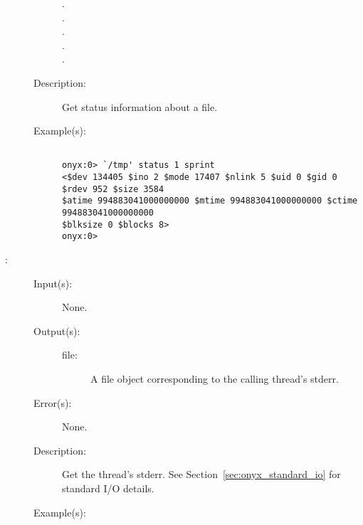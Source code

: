 \begin{description}
\begin{description}
\begin{description}
		\item[.]
		\item[.]
		\item[.]
		\item[.]
		\item[.]
		\end{description}
	\item[Description: ]
		Get status information about a file.
	\item[Example(s): ]\begin{verbatim}

onyx:0> `/tmp' status 1 sprint
<$dev 134405 $ino 2 $mode 17407 $nlink 5 $uid 0 $gid 0 $rdev 952 $size 3584
$atime 994883041000000000 $mtime 994883041000000000 $ctime 994883041000000000
$blksize 0 $blocks 8>
onyx:0>
		\end{verbatim}
	\end{description}
\label{systemdict:stderr}
\item[{\onyxop{--}{stderr}{file}}: ]
	\begin{description}\item[]
	\item[Input(s): ] None.
	\item[Output(s): ]
		\begin{description}\item[]
		\item[file: ]
			A file object corresponding to the calling thread's
			stderr.
		\end{description}
	\item[Error(s): ] None.
	\item[Description: ]
		Get the thread's stderr.  See Section~\ref{sec:onyx_standard_io}
		for standard I/O details.
	\item[Example(s): ]\begin{verbatim}


\end{verbatim}
\end{description}
\end{description}
